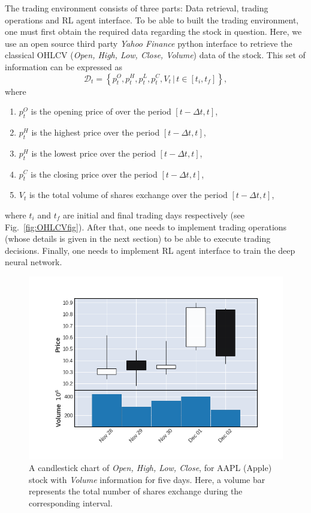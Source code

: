 \documentclass[conference]{IEEEtran}
\begin{document}
The trading environment consists of three parts: Data retrieval, trading operations and RL agent interface. To be able to built the trading environment, one must first obtain the required data regarding the stock in question. Here, we use an open source third party \textit{Yahoo Finance} python interface to retrieve the classical OHLCV (\textit{Open, High, Low, Close, Volume}) data of the stock. This set of information can be expressed as 
\begin{equation}\label{eq:OHLCVset}
    \mathcal{D}_t = \left\{p_{t}^O, p_{t}^H, p_{t}^L, p_{t}^C, V_{t} \,| \, t \in [t_i, t_f]\right\},
\end{equation}
where 
\begin{enumerate}[-]
    \item \(p_t^O\) is the opening price of over the period \([t - \Delta t, t]\),
    \item \(p_t^H\) is the highest price over the period \([t - \Delta t, t]\),
    \item \(p_t^H\) is the lowest price over the period \([t - \Delta t, t]\),
    \item \(p_t^C\) is the closing price over the period \([t - \Delta t, t]\),
    \item \(V_t\) is the total volume of shares exchange over the period \([t - \Delta t, t]\),
\end{enumerate}
where \(t_i\) and \(t_f\) are initial and final trading days respectively (see Fig.~\ref{fig:OHLCVfig}). After that, one needs to implement trading operations (whose details is given in the next section) to be able to execute trading decisions. Finally, one needs to implement RL agent interface to train the deep neural network. 

\begin{figure}
    \centering
    \includegraphics[scale=0.4]{Figs/Figures/OHLCV.png}
    \caption{A candlestick chart of \textit{Open, High, Low, Close}, for AAPL (Apple) stock with \textit{Volume} information for five days. Here, a volume bar represents the total number of shares exchange during the corresponding interval.}
\end{figure}
\end{document}
